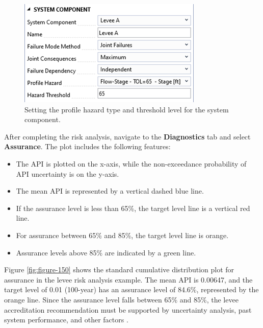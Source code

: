 \documentclass[
]{book}
\begin{document}
\begin{figure}

{\centering \includegraphics{images/figure149} 

}

\caption{Setting the profile hazard type and threshold level for the system component.}\label{fig:figure-149}
\end{figure}

After completing the risk analysis, navigate to the \textbf{Diagnostics} tab and select \textbf{Assurance}. The plot includes the following features:

\begin{itemize}
\item
  The API is plotted on the x-axis, while the non-exceedance probability of API uncertainty is on the y-axis.
\item
  The mean API is represented by a vertical dashed blue line.
\item
  If the assurance level is less than 65\%, the target level line is a vertical red line.
\item
  For assurance between 65\% and 85\%, the target level line is orange.
\item
  Assurance levels above 85\% are indicated by a green line.
\end{itemize}

Figure \ref{fig:figure-150} shows the standard cumulative distribution plot for assurance in the levee risk analysis example. The mean API is 0.00647, and the target level of 0.01 (100-year) has an assurance level of 84.6\%, represented by the orange line. Since the assurance level falls between 65\% and 85\%, the levee accreditation recommendation must be supported by uncertainty analysis, past system performance, and other factors \citep{cite-ECB2019}.
\end{document}
